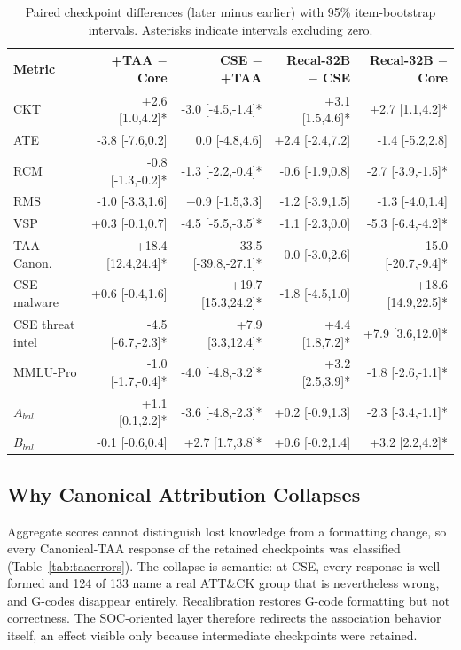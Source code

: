 \documentclass[conference]{IEEEtran}
\begin{document}
\begin{table}[t]
\caption{Paired checkpoint differences (later minus earlier) with 95\% item-bootstrap intervals. Asterisks indicate intervals excluding zero.}
\label{tab:transitions}
\centering
\scriptsize
\setlength{\tabcolsep}{2.5pt}
\begin{tabular}{@{}lrrrr@{}}
\toprule
Metric & +TAA $-$ Core & CSE $-$ +TAA & Recal-32B $-$ CSE & Recal-32B $-$ Core \\
\midrule
CKT & +2.6 [1.0,4.2]* & -3.0 [-4.5,-1.4]* & +3.1 [1.5,4.6]* & +2.7 [1.1,4.2]* \\
ATE & -3.8 [-7.6,0.2] & 0.0 [-4.8,4.6] & +2.4 [-2.4,7.2] & -1.4 [-5.2,2.8] \\
RCM & -0.8 [-1.3,-0.2]* & -1.3 [-2.2,-0.4]* & -0.6 [-1.9,0.8] & -2.7 [-3.9,-1.5]* \\
RMS & -1.0 [-3.3,1.6] & +0.9 [-1.5,3.3] & -1.2 [-3.9,1.5] & -1.3 [-4.0,1.4] \\
VSP & +0.3 [-0.1,0.7] & -4.5 [-5.5,-3.5]* & -1.1 [-2.3,0.0] & -5.3 [-6.4,-4.2]* \\
TAA Canon. & +18.4 [12.4,24.4]* & -33.5 [-39.8,-27.1]* & 0.0 [-3.0,2.6] & -15.0 [-20.7,-9.4]* \\
CSE malware & +0.6 [-0.4,1.6] & +19.7 [15.3,24.2]* & -1.8 [-4.5,1.0] & +18.6 [14.9,22.5]* \\
CSE threat intel & -4.5 [-6.7,-2.3]* & +7.9 [3.3,12.4]* & +4.4 [1.8,7.2]* & +7.9 [3.6,12.0]* \\
MMLU-Pro & -1.0 [-1.7,-0.4]* & -4.0 [-4.8,-3.2]* & +3.2 [2.5,3.9]* & -1.8 [-2.6,-1.1]* \\
$A_{bal}$ & +1.1 [0.1,2.2]* & -3.6 [-4.8,-2.3]* & +0.2 [-0.9,1.3] & -2.3 [-3.4,-1.1]* \\
$B_{bal}$ & -0.1 [-0.6,0.4] & +2.7 [1.7,3.8]* & +0.6 [-0.2,1.4] & +3.2 [2.2,4.2]* \\
\bottomrule
\end{tabular}
\end{table}

\subsection{Why Canonical Attribution Collapses}
Aggregate scores cannot distinguish lost knowledge from a formatting change, so every Canonical-TAA response of the retained checkpoints was classified (Table~\ref{tab:taaerrors}). The collapse is semantic: at CSE, every response is well formed and 124 of 133 name a real ATT\&CK group that is nevertheless wrong, and G-codes disappear entirely. Recalibration restores G-code formatting but not correctness. The SOC-oriented layer therefore redirects the association behavior itself, an effect visible only because intermediate checkpoints were retained.
\end{document}
